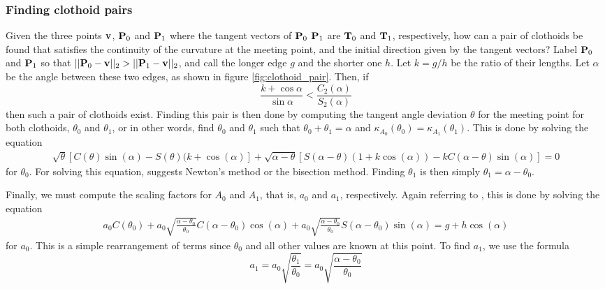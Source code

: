 \subsubsection{Finding clothoid pairs}
Given the three points $\mathbf{v}$, $\mathbf{P}_0$ and $\mathbf{P}_1$ where the tangent vectors of ${\mathbf P}_0$ ${\mathbf P}_1$ are ${\mathbf T}_0$ and ${\mathbf T}_1$, respectively, how can a pair of clothoids be found that satisfies the continuity of the curvature at the meeting point, and the initial direction given by the tangent vectors? Label ${\mathbf P}_0$ and ${\mathbf P}_1$ so that $||{\mathbf P}_0-\mathbf{v}||_2 > ||{\mathbf P}_1-\mathbf{v}||_2$, and call the longer edge $g$ and the shorter one $h$. Let $k=g/h$ be the ratio of their lengths. Let $\alpha$ be the angle between these two edges, as shown in figure \ref{fig:clothoid_pair}. Then, if
\begin{equation}
\frac{k + \cos{\alpha}}{\sin \alpha} < \frac{C_2(\alpha)}{S_2(\alpha)}
\label{eq:clothoid_asymmetry_condition}
\end{equation}
then such a pair of clothoids exist.\cite{clothoid} Finding this pair is then done by computing the tangent angle deviation $\theta$ for the meeting point for both clothoids, $\theta_0$ and $\theta_1$, or in other words, find $\theta_0$ and $\theta_1$ such that $\theta_0 + \theta_1 = \alpha$ and $\kappa_{A_0}(\theta_0) = \kappa_{A_1}(\theta_1)$. This is done by solving the equation 
\begin{align}
\sqrt{\theta}[C(\theta)\sin(\alpha) - S(\theta)(k+\cos(\alpha)] + \sqrt{\alpha-\theta}[S(\alpha-\theta)(1+k\cos(\alpha)) - kC(\alpha - \theta)\sin(\alpha)] = 0\label{eq:theta0equation}
\end{align}
for $\theta_0$. For solving this equation, \cite{clothoid} suggests Newton's method or the bisection method. Finding $\theta_1$ is then simply $\theta_1 = \alpha-\theta_0$.

Finally, we must compute the scaling factors for $A_0$ and $A_1$, that is, $a_0$ and $a_1$, respectively. Again referring to \cite{clothoid}, this is done by solving the equation
\begin{align}
a_0C(\theta_0)+a_0\sqrt{\frac{\alpha-\theta_0}{\theta_0}}C(\alpha-\theta_0)\cos(\alpha) + a_0\sqrt{\frac{\alpha-\theta_0}{\theta_0}}S(\alpha-\theta_0)\sin(\alpha) = g+h\cos(\alpha)\label{eq:a0equation}
\end{align}
for $a_0$. This is a simple rearrangement of terms since $\theta_0$ and all other values are known at this point. To find $a_1$, we use the formula\cite{clothoid}
\begin{equation}
a_1 = a_0 \sqrt{\frac{\theta_1}{\theta_0}} = a_0 \sqrt{\frac{\alpha - \theta_0}{\theta_0}}
\label{eq:a1equation}
\end{equation}

